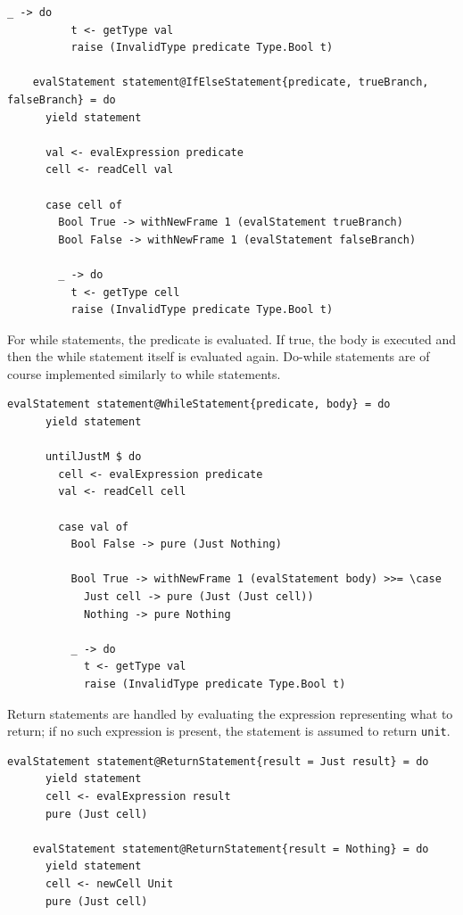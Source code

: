 \documentclass[UdineBachThesis,american,11pt]{PhdThesis}
\begin{document}
  \pagebreak

  \begin{Verbatim}[gobble=4,fontsize=\small]
        _ -> do
          t <- getType val
          raise (InvalidType predicate Type.Bool t)

    evalStatement statement@IfElseStatement{predicate, trueBranch, falseBranch} = do
      yield statement

      val <- evalExpression predicate
      cell <- readCell val

      case cell of
        Bool True -> withNewFrame 1 (evalStatement trueBranch)
        Bool False -> withNewFrame 1 (evalStatement falseBranch)

        _ -> do
          t <- getType cell
          raise (InvalidType predicate Type.Bool t)
  \end{Verbatim}

  For while statements, the predicate is evaluated. If true, the body is
  executed and then the while statement itself is evaluated again. Do-while
  statements are of course implemented similarly to while statements.

  \begin{Verbatim}[gobble=4,fontsize=\small]
    evalStatement statement@WhileStatement{predicate, body} = do
      yield statement

      untilJustM $ do
        cell <- evalExpression predicate
        val <- readCell cell

        case val of
          Bool False -> pure (Just Nothing)

          Bool True -> withNewFrame 1 (evalStatement body) >>= \case
            Just cell -> pure (Just (Just cell))
            Nothing -> pure Nothing

          _ -> do
            t <- getType val
            raise (InvalidType predicate Type.Bool t)
  \end{Verbatim}

  Return statements are handled by evaluating the expression representing what
  to return; if no such expression is present, the statement is assumed to
  return \mbox{\texttt{unit}}.

  \begin{Verbatim}[gobble=4,fontsize=\small]
    evalStatement statement@ReturnStatement{result = Just result} = do
      yield statement
      cell <- evalExpression result
      pure (Just cell)

    evalStatement statement@ReturnStatement{result = Nothing} = do
      yield statement
      cell <- newCell Unit
      pure (Just cell)
  \end{Verbatim}
\end{document}
